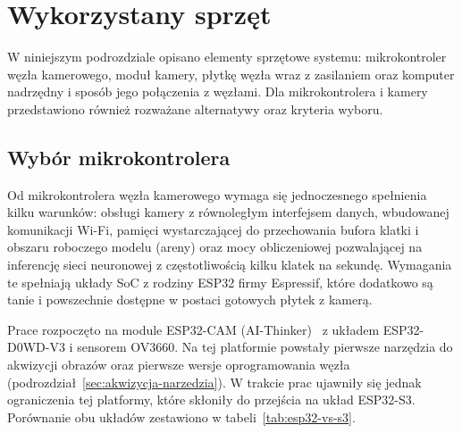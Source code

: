 \section{Wykorzystany sprzęt}
\label{sec:sprzet}

W niniejszym podrozdziale opisano elementy sprzętowe systemu: mikrokontroler
węzła kamerowego, moduł kamery, płytkę węzła wraz z zasilaniem oraz komputer
nadrzędny i sposób jego połączenia z węzłami. Dla mikrokontrolera i kamery
przedstawiono również rozważane alternatywy oraz kryteria wyboru.


\subsection{Wybór mikrokontrolera}
\label{subsec:mikrokontroler}
 
Od mikrokontrolera węzła kamerowego wymaga się jednoczesnego spełnienia
kilku warunków: obsługi kamery z równoległym interfejsem danych,
wbudowanej komunikacji Wi-Fi, pamięci wystarczającej do przechowania
bufora klatki i obszaru roboczego modelu (areny) oraz mocy obliczeniowej
pozwalającej na inferencję sieci neuronowej z częstotliwością kilku klatek
na sekundę. Wymagania te spełniają układy SoC z rodziny ESP32 firmy
Espressif, które dodatkowo są tanie i powszechnie dostępne w postaci
gotowych płytek z kamerą.
 
Prace rozpoczęto na module ESP32-CAM (AI-Thinker)~\cite{aithinker_esp32cam}
z układem ESP32-D0WD-V3 i sensorem OV3660. Na tej platformie powstały pierwsze narzędzia do
akwizycji obrazów oraz pierwsze wersje oprogramowania węzła
(podrozdział~\ref{sec:akwizycja-narzedzia}). W trakcie prac ujawniły się
jednak ograniczenia tej platformy, które skłoniły do przejścia na układ
ESP32-S3. Porównanie obu układów zestawiono w tabeli~\ref{tab:esp32-vs-s3}.
 
